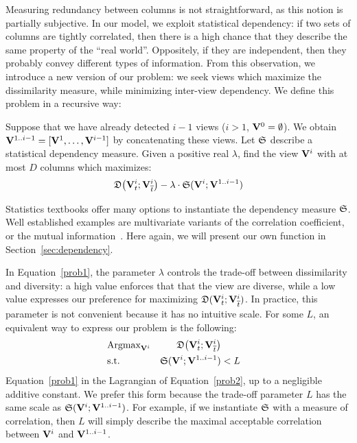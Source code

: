 Measuring redundancy between columns is not straightforward, as this notion is
partially subjective. In our model, we exploit statistical dependency: if two
sets of columns are tightly correlated, then there is a high chance that they
describe the same property of the ``real world''.  Oppositely, if they are
independent, then they probably convey different types of information. From
this observation, we introduce a new version of our problem: we seek views
which maximize the dissimilarity measure, while minimizing inter-view dependency.
We define this problem in a recursive way:
\begin{problem}
    Suppose that we have already detected $i-1$ views ($i > 1$,
    $\mathbf{V}^{0} = \emptyset$). We obtain $\mathbf{V}^{1..i-1} = [\mathbf{V}^1, \ldots,
    \mathbf{V}^{i-1}]$ by concatenating these views. Let $\mathfrak{S}$ describe a
    statistical dependency measure. Given a positive real $\lambda$, find the
    view $\mathbf{V}^{i}$ with at most $D$ columns which maximizes:
        \begin{equation}
            \label{prob1}
            \mathfrak{D}\big( \mathbf{V}^{i}_t  ; \mathbf{V}^{i}_{\overline{t}} \big) - 
            \lambda \cdot \mathfrak{S} ( \mathbf{V}^{i} ; \mathbf{V}^{1..i-1})
        \end{equation}
\end{problem}
Statistics textbooks offer many options to instantiate the dependency measure
$\mathfrak{S}$. Well established examples are multivariate variants of the
correlation coefficient, or the mutual information~\cite{wasserman2013all}.
Here again, we will present our own function in Section~\ref{sec:dependency}.

In Equation~\ref{prob1}, the parameter $\lambda$ controls the trade-off between
dissimilarity and diversity: a high value enforces that that the view are
diverse, while a low value expresses our preference for maximizing $\mathfrak{D}(
\mathbf{V}^{i}_t  ; \mathbf{V}^{i}_{\overline{t}})$. In practice, this parameter is
not convenient because it has no intuitive scale. For some $L$, an
equivalent way to express our problem is the following:
\begin{equation}
    \label{prob2}
    \begin{aligned}
        & \text{Argmax}_{\mathbf{V}^{i}} 
            & \mathfrak{D}\big( \mathbf{V}^{i}_t  ; \mathbf{V}^{i}_{\overline{t}} \big)\\
        & \text{s.t.} 
        &\mathfrak{S} ( \mathbf{V}^{i} ; \mathbf{V}^{1..i-1}) & < L\\ 
    \end{aligned}
\end{equation}
Equation~\ref{prob1} in the Lagrangian of Equation~\ref{prob2}, up to a
negligible additive constant. We prefer this form because the trade-off
parameter $L$ has the same scale as $\mathfrak{S} ( \mathbf{V}^{i} ; \mathbf{V}^{1..i-1}) $.
For example, if we instantiate $\mathfrak{S}$ with a measure of correlation, then $L$ will
simply describe the maximal acceptable correlation between $\mathbf{V}^{i}$ and
$\mathbf{V}^{1..i-1}$.

